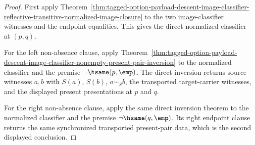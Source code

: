 \begin{proof}
First apply
Theorem~\ref{thm:tagged-option-payload-descent-image-classifier-reflective-transitive-normalized-image-closure}
to the two image-classifier witnesses and the endpoint equalities. This gives
the direct normalized classifier at $(p,q)$.

For the left non-absence clause, apply
Theorem~\ref{thm:tagged-option-payload-descent-image-classifier-nonempty-present-pair-inversion}
to the normalized classifier and the premise $\neg\hsame(p,\emp)$. The direct
inversion returns source witnesses $a,b$ with $S(a)$, $S(b)$, $a\sim_S b$, the
transported target-carrier witnesses, and the displayed present presentations at
$p$ and $q$.

For the right non-absence clause, apply the same direct inversion theorem to the
normalized classifier and the premise $\neg\hsame(q,\emp)$. Its right endpoint
clause returns the same synchronized transported present-pair data, which is the
second displayed conclusion.
\end{proof}

